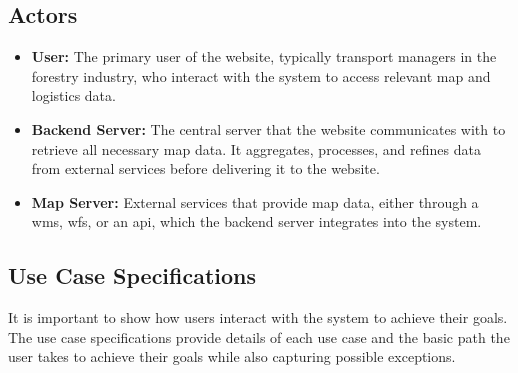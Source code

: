 \subsection{Actors}
\begin{itemize}
    \item \textbf{User:} The primary user of the website, typically transport managers in the forestry industry, who interact with the system to access relevant map and logistics data.
    \item \textbf{Backend Server:} The central server that the website communicates with to retrieve all necessary map data. It aggregates, processes, and refines data from external services before delivering it to the website.
    \item \textbf{Map Server:} External services that provide map data, either through a \Gls{wms}, \Gls{wfs}, or an \acrshort{api}, which the backend server integrates into the system.
\end{itemize}


\subsection{Use Case Specifications}
It is important to show how users interact with the system to achieve their goals. The use case specifications provide details of each use case and the basic path the user takes to achieve their goals while also capturing possible exceptions. 

